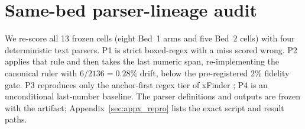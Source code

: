 \documentclass{article}
\begin{document}
\section{Same-bed parser-lineage audit}\label{sec:appx_parser}

We re-score all 13 frozen cells (eight Bed~1 arms and five Bed~2 cells) with
four deterministic text parsers.  \textsc{P1} is strict boxed-regex with a
miss scored wrong.  \textsc{P2} applies that rule and then takes the last
numeric span, re-implementing the canonical ruler with $6/2136=0.28\%$ drift,
below the pre-registered $2\%$ fidelity gate.  \textsc{P3} reproduces only the
anchor-first regex tier of xFinder \citep{yu2024xfinder}; \textsc{P4} is an
unconditional last-number baseline.  The parser definitions and outputs are
frozen with the artifact; Appendix~\ref{sec:appx_repro} lists the exact
script and result paths.
\end{document}
